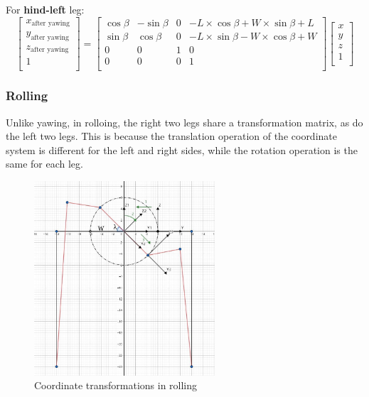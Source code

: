 For \textbf{hind-left} leg:
\begin{equation}
   \begin{bmatrix}
   x_\text{after yawing} \\
   y_\text{after yawing} \\
   z_\text{after yawing} \\
   1                     \\
   \end{bmatrix}
   =
   \begin{bmatrix}
   \cos\beta & -\sin\beta & 0 & -L \times \cos\beta + W \times \sin\beta + L \\
   \sin\beta & \cos\beta & 0 & -L \times \sin\beta - W \times \cos\beta + W \\
   0 & 0 & 1 & 0 \\
   0 & 0 & 0 & 1 \\
   \end{bmatrix}
   \begin{bmatrix}
   x \\
   y \\
   z \\
   1 \\
   \end{bmatrix}
\end{equation}

\subsubsection{Rolling}

Unlike yawing, in rolloing, the right two legs share a transformation matrix, as do the left two legs. This is because the translation operation of the coordinate system is different for the left and right sides, while the rotation operation is the same for each leg.

\begin{figure}[htbp]
   \centering
   \includegraphics[width=0.6\textwidth]{figures/coordinate_transformations_in_rolling.jpg}
   \caption{Coordinate transformations in rolling}
   \label{fig:coordinate_transformations_in_rolling}
\end{figure}

